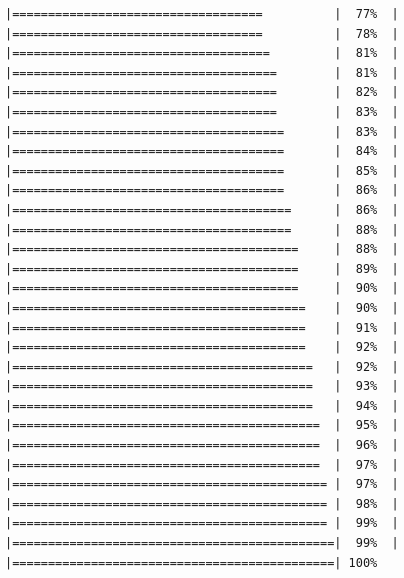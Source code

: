 \documentclass[
  krantz2]{krantz}
\begin{document}
\begin{verbatim}
|===================================          |  77%  |                                                     |===================================          |  78%  |                                                     |====================================         |  81%  |                                                     |=====================================        |  81%  |                                                     |=====================================        |  82%  |                                                     |=====================================        |  83%  |                                                     |======================================       |  83%  |                                                     |======================================       |  84%  |                                                     |======================================       |  85%  |                                                     |======================================       |  86%  |                                                     |=======================================      |  86%  |                                                     |=======================================      |  88%  |                                                     |========================================     |  88%  |                                                     |========================================     |  89%  |                                                     |========================================     |  90%  |                                                     |=========================================    |  90%  |                                                     |=========================================    |  91%  |                                                     |=========================================    |  92%  |                                                     |==========================================   |  92%  |                                                     |==========================================   |  93%  |                                                     |==========================================   |  94%  |                                                     |===========================================  |  95%  |                                                     |===========================================  |  96%  |                                                     |===========================================  |  97%  |                                                     |============================================ |  97%  |                                                     |============================================ |  98%  |                                                     |============================================ |  99%  |                                                     |=============================================|  99%  |                                                     |=============================================| 100%
\end{verbatim}
\end{document}

